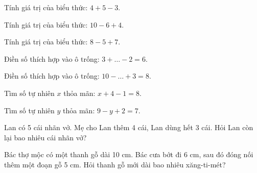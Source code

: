 \begin{ex}
Tính giá trị của biểu thức: $4 + 5 - 3$.
\end{ex}

\begin{ex}
Tính giá trị của biểu thức: $10 - 6 + 4$.
\end{ex}

\begin{ex}
Tính giá trị của biểu thức: $8 - 5 + 7$.
\end{ex}

\begin{ex}
Điền số thích hợp vào ô trống: $3 + \dots - 2 = 6$.
\end{ex}

\begin{ex}
Điền số thích hợp vào ô trống: $10 - \dots + 3 = 8$.
\end{ex}

\begin{ex}
Tìm số tự nhiên $x$ thỏa mãn: $x + 4 - 1 = 8$.
\end{ex}

\begin{ex}
Tìm số tự nhiên $y$ thỏa mãn: $9 - y + 2 = 7$.
\end{ex}

\begin{ex}
Lan có 5 cái nhãn vở. Mẹ cho Lan thêm 4 cái, Lan dùng hết 3 cái. Hỏi Lan còn lại bao nhiêu cái nhãn vở?
\end{ex}

\begin{ex}
Bác thợ mộc có một thanh gỗ dài 10 cm. Bác cưa bớt đi 6 cm, sau đó đóng nối thêm một đoạn gỗ 5 cm. Hỏi thanh gỗ mới dài bao nhiêu xăng-ti-mét?
\end{ex}

